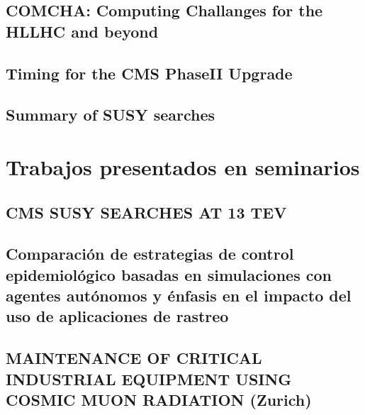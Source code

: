 \documentclass[a4paper, 11pt, twoside, openright]{report}
\begin{document}
\subsection{COMCHA: Computing Challanges for the HLLHC and beyond}

\subsection{Timing for the CMS PhaseII Upgrade}

\subsection{Summary of SUSY searches}



\section{Trabajos presentados en seminarios}

\subsection{CMS SUSY SEARCHES AT 13 TEV}


\subsection{Comparación de estrategias de control epidemiológico basadas en simulaciones con agentes autónomos y énfasis en el impacto del uso de aplicaciones de rastreo}


\subsection{MAINTENANCE OF CRITICAL INDUSTRIAL EQUIPMENT USING COSMIC MUON RADIATION (Zurich)}

\end{document}
